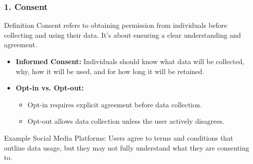 \documentclass[aspectratio=169]{beamer}
\begin{document}
\begin{frame}[fragile]
    \frametitle{1. Consent}
    \begin{block}{Definition}
        Consent refers to obtaining permission from individuals before collecting and using their data. It's about ensuring a clear understanding and agreement.
    \end{block}

    \begin{itemize}
        \item \textbf{Informed Consent:} Individuals should know what data will be collected, why, how it will be used, and for how long it will be retained.
        \item \textbf{Opt-in vs. Opt-out:} 
        \begin{itemize}
            \item Opt-in requires explicit agreement before data collection.
            \item Opt-out allows data collection unless the user actively disagrees.
        \end{itemize}
    \end{itemize}

    \begin{block}{Example}
        Social Media Platforms: Users agree to terms and conditions that outline data usage, but they may not fully understand what they are consenting to.
    \end{block}
\end{frame}
\end{document}
